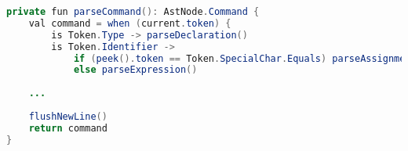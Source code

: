 \begin{lstlisting}[language=java,label=lis:parseCommand,caption=A simplified version of the parse declaration method from the parser.]
private fun parseCommand(): AstNode.Command {
    val command = when (current.token) {
	    is Token.Type -> parseDeclaration()
	    is Token.Identifier ->
		    if (peek().token == Token.SpecialChar.Equals) parseAssignment() 
		    else parseExpression()
    
    ...
    
    flushNewLine()
    return command
}
\end{lstlisting}




